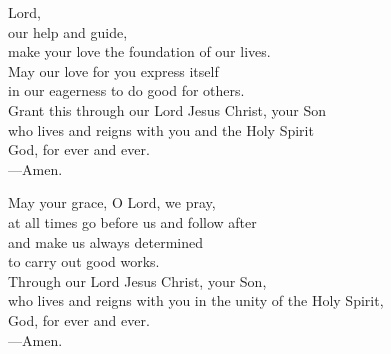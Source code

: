 \prayer


\begin{prayerverse}
Lord,\\
our help and guide,\\
make your love the foundation of our lives.\\
May our love for you express itself\\
in our eagerness to do good for others.\\
Grant this through our Lord Jesus Christ, your Son\\
who lives and reigns with you and the Holy Spirit\\
God, for ever and ever.\\
{\color{red}---\thinspace}Amen.
\end{prayerverse}


\begin{prayerverse}
May your grace, O Lord, we pray,\\
at all times go before us and follow after\\
and make us always determined\\
to carry out good works.\\
Through our Lord Jesus Christ, your Son,\\
who lives and reigns with you in the unity of the Holy Spirit,\\
God, for ever and ever.\\
{\color{red}---\thinspace}Amen.
\end{prayerverse}


